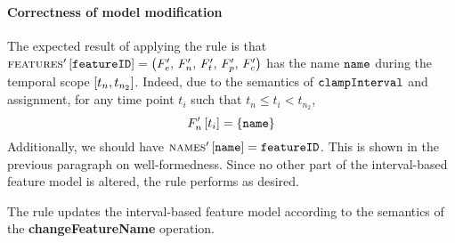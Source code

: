 \paragraph{Correctness of model modification}
The expected result of applying the rule is that $\textsc{features}' \left[ \texttt{featureID} \right] = \left(F'_e,\, F'_n,\, F'_t,\, F'_p,\, F'_c\right)$ has the name $\texttt{name}$ during the temporal scope $\interval{t_n}{t_{n_2}}$. Indeed, due to the semantics of $\texttt{clampInterval}$ and assignment, for any time point $t_i$ such that $t_n \leq t_i < t_{n_2}$,
\[
   F'_n \left[ t_i \right] = \left\{\texttt{name}\right\}
\]
Additionally, we should have $\textsc{names}' \left[ \texttt{name} \right] = \texttt{featureID}$. This is shown in the previous paragraph on well-formedness.
Since no other part of the interval-based feature model is altered, the rule performs as desired.
\\

\begin{lemma}
   The  rule updates the interval-based feature model according to the semantics of the \textbf{changeFeatureName} operation.
   \label{lemma:change-feature-name-mod}
\end{lemma}

